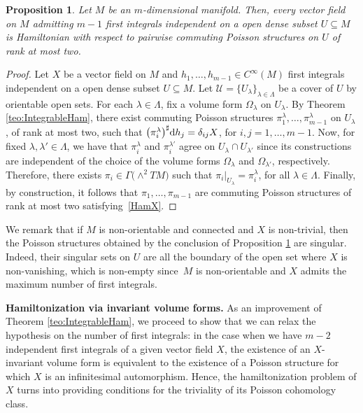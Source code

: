 \documentclass[10pt,a4paper]{amsart}
\newcommand{\dd}{{\rm d}}
\numberwithin{equation}{section}
\newtheorem{Proposition}[Theorem]{Proposition}
 { \theoremstyle{definition}
\newtheorem{Definition}[Theorem]{Definition}
\newtheorem{Note}[Theorem]{Note}
\newtheorem{Example}[Theorem]{Example}
\newtheorem{Remark}[Theorem]{Remark} }
\begin{document}
\begin{Proposition}\label{prop:IntegrableHam}
Let $M$ be an $m$-dimensional manifold. Then, every vector field on $M$ admitting $m-1$ first integrals independent on a open dense subset $U\subseteq M$ is Hamiltonian with respect to pairwise commuting Poisson structures on $U$ of rank at most two.
\end{Proposition}
\begin{proof}
Let $X$ be a vector field on $M$ and $h_1, \dots, h_{m-1} \in C^{\infty}(M)$ first integrals independent on a open dense subset $U \subseteq M$. Let $\mathcal{U}=\{U_{\lambda}\}_{\lambda\in\Lambda}$ be a cover of $U$ by orientable open sets. For each $\lambda \in \Lambda$, fix a volume form $\Omega_{\lambda}$ on $U_{\lambda}$. By Theorem \ref{teo:IntegrableHam}, there exist commuting Poisson structures $\pi_{1}^{\lambda},\dots,\pi_{m-1}^{\lambda}$ on $U_{\lambda}$, of rank at most two, such that $\big(\pi_{i}^{\lambda}\big)^{\sharp}\dd h_{j} = \delta_{ij}X$, for $i,j=1,\dots,m-1$. Now, for fixed $\lambda,\lambda'\in\Lambda$, we have that $\pi_{i}^{\lambda}$ and $\pi_{i}^{\lambda'}$ agree on $U_{\lambda}\cap U_{\lambda'}$ since its constructions are independent of the choice of the volume forms $\Omega_{\lambda}$ and $\Omega_{\lambda'}$, respectively. Therefore, there exists $\pi_{i}\in\Gamma\big({\wedge}^2TM\big)$ such that $\pi_{i}|_{U_{\lambda}} = \pi_{i}^{\lambda}$, for all $\lambda \in \Lambda$. Finally, by construction, it follows that $\pi_1,\dots,\pi_{m-1}$ are commuting Poisson structures of rank at most two satisfying~\eqref{HamX}.
\end{proof}

We remark that if $M$ is non-orientable and connected and $X$ is non-trivial, then the Poisson structures obtained by the conclusion of Proposition \ref{prop:IntegrableHam} are singular. Indeed, their singular sets on $U$ are all the boundary of the open set where $X$ is non-vanishing, which is non-empty since~$M$ is non-orientable and $X$ admits the maximum number of first integrals.

{\bf Hamiltonization via invariant volume forms.} As an improvement of Theorem \ref{teo:IntegrableHam}, we proceed to show that we can relax the hypothesis on the number of first integrals: in the case when we have $m-2$ independent first integrals of a given vector field $X$, the existence of an $X$-invariant volume form is equivalent to the existence of a Poisson structure for which $X$ is an infinitesimal automorphism. Hence, the hamiltonization problem of $X$ turns into providing conditions for the triviality of its Poisson cohomology class.
\end{document}
